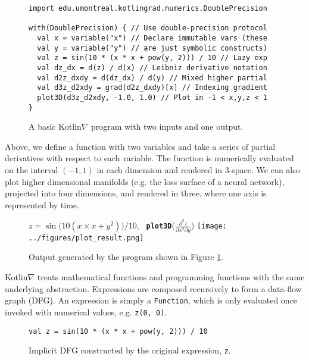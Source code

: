 \documentclass{article}
\begin{document}
\squeezeup\begin{figure}[!htb]
\begin{lstlisting}
import edu.umontreal.kotlingrad.numerics.DoublePrecision

with(DoublePrecision) { // Use double-precision protocol
  val x = variable("x") // Declare immutable vars (these
  val y = variable("y") // are just symbolic constructs)
  val z = sin(10 * (x * x + pow(y, 2))) / 10 // Lazy exp
  val dz_dx = d(z) / d(x) // Leibniz derivative notation
  val d2z_dxdy = d(dz_dx) / d(y) // Mixed higher partial
  val d3z_d2xdy = grad(d2z_dxdy)[x] // Indexing gradient
  plot3D(d3z_d2xdy, -1.0, 1.0) // Plot in -1 < x,y,z < 1
}
\end{lstlisting}
\squeezeup\squeezeup
\caption{A basic Kotlin$\nabla$ program with two inputs and one output.}
\label{label:fig1}
\end{figure}

\squeezeup Above, we define a function with two variables and take a series of partial derivatives with respect to each variable. The function is numerically evaluated on the interval $(-1, 1)$ in each dimension and rendered in 3-space. We can also plot higher dimensional manifolds (e.g. the loss surface of a neural network), projected into four dimensions, and rendered in three, where one axis is represented by time.

\squeezeup\begin{figure}[!htb]
\centering $z = \sin{\big(10(x \times x + y^2)\big)} / 10$, \textbf{\texttt{ plot3D}}$\Big(\frac{\partial^3z}{\partial{x^2}\partial{y}}\Big)$
\texttt{[image: ../figures/plot\_result.png]}
\squeezeup\caption{Output generated by the program shown in Figure \ref{label:fig1}.}\squeezeup
\end{figure}

Kotlin$\nabla$ treats mathematical functions and programming functions with the same underlying abstraction. Expressions are composed recursively to form a data-flow graph (DFG). An expression is simply a \texttt{Function}, which is only evaluated once invoked with numerical values, e.g. \texttt{z(0, 0)}.

\squeezeup\begin{figure}[!htb]
\centering
\begin{lstlisting}[basicstyle=\ttfamily\small]
 val z = sin(10 * (x * x + pow(y, 2))) / 10
\end{lstlisting}
\squeezeup\centering
{}
\squeezeup\squeezeup\squeezeup\caption{Implicit DFG constructed by the original expression, \texttt{z}.}
\end{figure}
\end{document}

